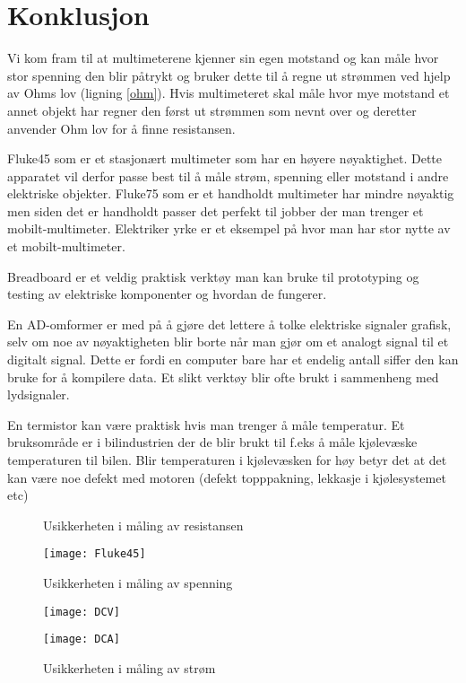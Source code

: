 \documentclass[norsk,a4paper,12pt]{article}
\begin{document}
\section{Konklusjon}
Vi kom fram til at multimeterene kjenner sin egen motstand og kan måle hvor stor spenning den blir påtrykt og bruker dette til å regne ut strømmen ved hjelp av Ohms lov (ligning \vref{ohm}). Hvis multimeteret skal måle hvor mye motstand et annet objekt har regner den først ut strømmen som nevnt over og deretter anvender Ohm lov for å finne resistansen. 

Fluke45 som er et stasjonært multimeter som har en høyere nøyaktighet. Dette apparatet vil derfor passe best til å måle strøm, spenning eller motstand i andre elektriske objekter. Fluke75 som er et handholdt multimeter har mindre nøyaktig men siden det er handholdt passer det perfekt til jobber der man trenger et mobilt-multimeter. Elektriker yrke er et eksempel på hvor man har stor nytte av et mobilt-multimeter. 

Breadboard er et veldig praktisk verktøy man kan bruke til prototyping og testing av elektriske komponenter og hvordan de fungerer. 

En AD-omformer er med på å gjøre det lettere å tolke elektriske signaler grafisk, selv om noe av nøyaktigheten blir borte når man gjør om et analogt signal til et digitalt signal. Dette er fordi en computer bare har et endelig antall siffer den kan bruke for å kompilere data. Et slikt verktøy blir ofte brukt i sammenheng med lydsignaler. 

En termistor kan være praktisk hvis man trenger å måle temperatur. Et bruksområde er i bilindustrien der de blir brukt til f.eks å måle kjølevæske temperaturen til bilen. Blir temperaturen i kjølevæsken for høy betyr det at det kan være noe defekt med motoren (defekt topppakning, lekkasje i kjølesystemet etc) 

\begin{figure}
	\begin{minipage}[c]{\textwidth}
		\caption[Usikkerhet i $\Omega$ Fluke45]{Usikkerheten i måling av resistansen}  
  		\texttt{[image: Fluke45]}	
		\label{F45}
  	\end{minipage} 
	\begin{minipage}[c]{0.5\textwidth}
		\caption[Usikkerhet i Volt Fluke45]{Usikkerheten i måling av spenning}  
  		\texttt{[image: DCV]}	
		\label{F45DCV}
  	\end{minipage} 
	\hspace{0.5cm}
	\begin{minipage}[c]{0.5\textwidth}
		\caption[Usikkerhet i Ampere Fluke45]{Usikkerheten i måling av strøm}  
  		\texttt{[image: DCA]}	
		\label{F45DCA}
  	\end{minipage} 
\end{figure}
 
\end{document}
